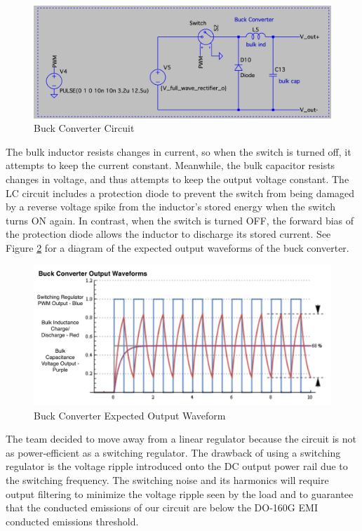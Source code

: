 \documentclass[conference]{IEEEtran}
\begin{document}
\begin{figure}[h]
    \centering
    \includegraphics[width=1.0\linewidth]{buck_converter_circuit.png}
    \caption{Buck Converter Circuit}
    \label{fig:buck_converter_circuit_diagram}
\end{figure}

The bulk inductor resists changes in current, so when the switch is turned off, it attempts to keep the current constant. Meanwhile, the bulk capacitor resists changes in voltage, and thus attempts to keep the output voltage constant. The LC circuit includes a protection diode to prevent the switch from being damaged by a reverse voltage spike from the inductor's stored energy when the switch turns ON again. In contrast, when the switch is turned OFF, the forward bias of the protection diode allows the inductor to discharge its stored current. See Figure \ref{fig:buck_converter_waveform_diagram} for a diagram of the expected output waveforms of the buck converter.

\begin{figure}[h]
    \centering
    \includegraphics[width=1.0\linewidth]{buck_converter_waveform.png}
    \caption{Buck Converter Expected Output Waveform}
    \label{fig:buck_converter_waveform_diagram}
\end{figure}

The team decided to move away from a linear regulator because the circuit is not as power-efficient as a switching regulator. The drawback of using a switching regulator is the voltage ripple introduced onto the DC output power rail due to the switching frequency. The switching noise and its harmonics will require output filtering to minimize the voltage ripple seen by the load and to guarantee that the conducted emissions of our circuit are below the DO-160G EMI conducted emissions threshold. 
\end{document}
